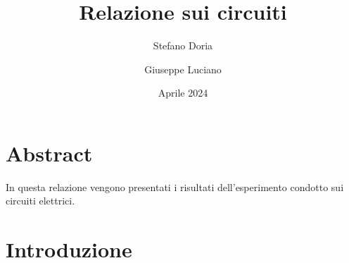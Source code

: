 \documentclass[12pt, letterpaper]{article}
\begin{document}
\title{\textbf{Relazione sui circuiti}}
\author{Stefano Doria \and Giuseppe Luciano}
\date{Aprile 2024}

\maketitle

\section{Abstract}
In questa relazione vengono presentati i risultati dell'esperimento condotto sui circuiti elettrici.

\section{Introduzione}
\end{document}
